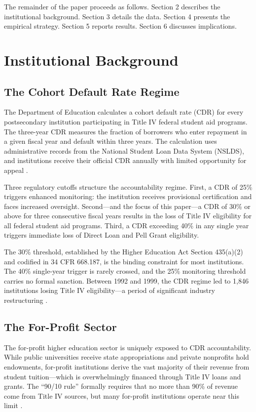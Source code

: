 \documentclass[12pt]{article}
\begin{document}
The remainder of the paper proceeds as follows. Section 2 describes the institutional background. Section 3 details the data. Section 4 presents the empirical strategy. Section 5 reports results. Section 6 discusses implications.


\section{Institutional Background}

\subsection{The Cohort Default Rate Regime}

The Department of Education calculates a cohort default rate (CDR) for every postsecondary institution participating in Title IV federal student aid programs. The three-year CDR measures the fraction of borrowers who enter repayment in a given fiscal year and default within three years. The calculation uses administrative records from the National Student Loan Data System (NSLDS), and institutions receive their official CDR annually with limited opportunity for appeal \citep{student_aid_2020}.

Three regulatory cutoffs structure the accountability regime. First, a CDR of 25\% triggers enhanced monitoring: the institution receives provisional certification and faces increased oversight. Second---and the focus of this paper---a CDR of 30\% or above for three consecutive fiscal years results in the loss of Title IV eligibility for all federal student aid programs. Third, a CDR exceeding 40\% in any single year triggers immediate loss of Direct Loan and Pell Grant eligibility.

The 30\% threshold, established by the Higher Education Act Section 435(a)(2) and codified in 34 CFR 668.187, is the binding constraint for most institutions. The 40\% single-year trigger is rarely crossed, and the 25\% monitoring threshold carries no formal sanction. Between 1992 and 1999, the CDR regime led to 1,846 institutions losing Title IV eligibility---a period of significant industry restructuring \citep{student_aid_2020}.

\subsection{The For-Profit Sector}

The for-profit higher education sector is uniquely exposed to CDR accountability. While public universities receive state appropriations and private nonprofits hold endowments, for-profit institutions derive the vast majority of their revenue from student tuition---which is overwhelmingly financed through Title IV loans and grants. The ``90/10 rule'' formally requires that no more than 90\% of revenue come from Title IV sources, but many for-profit institutions operate near this limit \citep{cellini2020}.
\end{document}
